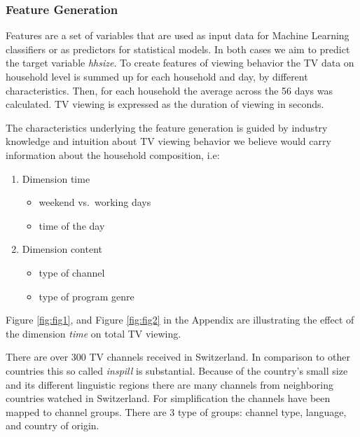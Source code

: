 \documentclass[]{article}
\providecommand{\tightlist}{%
  \setlength{\itemsep}{0pt}\setlength{\parskip}{0pt}}
\begin{document}
\hypertarget{feature-generation}{%
\subsubsection{Feature Generation}\label{feature-generation}}

Features are a set of variables that are used as input data for Machine
Learning classifiers or as predictors for statistical models. In both
cases we aim to predict the target variable \emph{hhsize}. To create
features of viewing behavior the TV data on household level is summed up
for each household and day, by different characteristics. Then, for each
household the average across the 56 days was calculated. TV viewing is
expressed as the duration of viewing in seconds.

The characteristics underlying the feature generation is guided by
industry knowledge and intuition about TV viewing behavior we believe
would carry information about the household composition, i.e:

\begin{enumerate}
\def\labelenumi{\arabic{enumi}.}
\tightlist
\item
  Dimension time

  \begin{itemize}
  \tightlist
  \item
    weekend vs.~working days
  \item
    time of the day
  \end{itemize}
\item
  Dimension content

  \begin{itemize}
  \tightlist
  \item
    type of channel
  \item
    type of program genre
  \end{itemize}
\end{enumerate}

Figure \ref{fig:fig1}, and Figure \ref{fig:fig2} in the Appendix are
illustrating the effect of the dimension \emph{time} on total TV
viewing.

There are over 300 TV channels received in Switzerland. In comparison to
other countries this so called \emph{inspill} is substantial. Because of
the country's small size and its different linguistic regions there are
many channels from neighboring countries watched in Switzerland. For
simplification the channels have been mapped to channel groups. There
are 3 type of groups: channel type, language, and country of origin.
\end{document}
